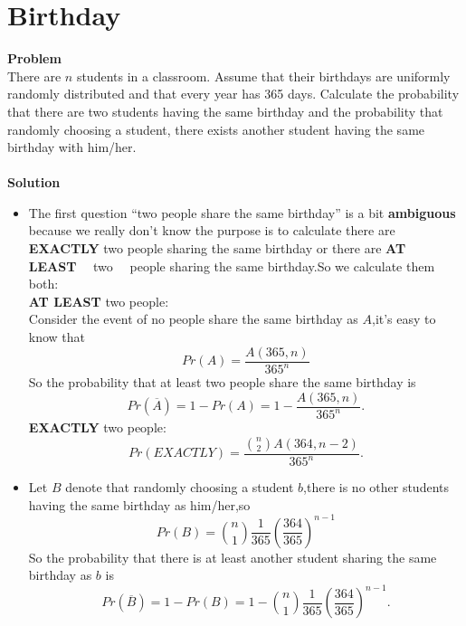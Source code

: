 	\section{Birthday}
	\textbf{Problem}\\
	There are $n$ students in a classroom. Assume that their birthdays are uniformly randomly distributed and that every year has 365 days. Calculate the probability that there are two students having the same birthday and the probability that randomly choosing a student, there exists another student having the same birthday with him/her.\\\\
	\textbf{Solution}\\
	\begin{itemize}
		\item The first question ``two people share the same birthday'' is a bit \textbf{ambiguous} because we really don't know the purpose is to calculate there are \textbf{EXACTLY} two people sharing the same birthday or there are \textbf{AT　 LEAST}　  two 　people sharing the same birthday.So we calculate them both:\\
		\textbf{AT LEAST} two people:\\
			Consider the event of no people share the same birthday as $A$,it's easy to know that
			\begin{equation*}
			Pr(A)=\frac{A(365,n)}{365^n}
			\end{equation*}
			So the probability that at least two people share the same birthday is
			\begin{equation*}
				Pr \left(\overline{A} \right)=1-Pr(A)=1-\frac{A(365,n)}{365^n}.
			\end{equation*}
			\textbf{EXACTLY} two people:\\
			\[
			Pr(EXACTLY)=\frac{\binom{n}{2} A(364,n-2)}{365^n}.
			\]
		\item
			Let $B$ denote that randomly choosing a student $b$,there is no other students having the same birthday as him/her,so
			\begin{equation*}
				Pr(B)=\binom{n}{1} \frac{1}{365} \left(\frac{364}{365}\right)^{n-1} 
			\end{equation*}
				So the probability that there is at least another student sharing the same birthday as $b$ is
				\begin{equation*}
				Pr \left(\overline{B} \right)=1-Pr(B)=1-\binom{n}{1} \frac{1}{365} \left(\frac{364}{365}\right)^{n-1}.
				\end{equation*}
	\end{itemize}
	
